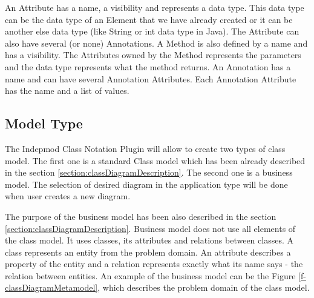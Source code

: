 An Attribute has a name, a visibility and represents a data type. This data type can be the data type of an Element that we have already created or it can be another else data type (like String or int data type in Java). The Attribute can also have several (or none) Annotations. A Method is also defined by a name and has a visibility. The Attributes owned by the Method represents the parameters and the data type represents what the method returns. An Annotation has a name and can have several Annotation Attributes. Each Annotation Attribute has the name and a list of values.

\subsection{Model Type}

The Indepmod Class Notation Plugin will allow to create two types of class model. The first one is a standard Class model which has been already described in the section \ref{section:classDiagramDescription}. The second one is a business model. The selection of desired diagram in the application type will be done when user creates a new diagram. 

The purpose of the business model has been also described in the section \ref{section:classDiagramDescription}. Business model does not use all elements of the class model. It uses classes, its attributes and relations between classes. A class represents an entity from the problem domain. An attribute describes a property of the entity and a relation represents exactly what its name says - the relation between entities. An example of the business model can be the Figure \ref{f-classDiagramMetamodel}, which describes the problem domain of the class model.
